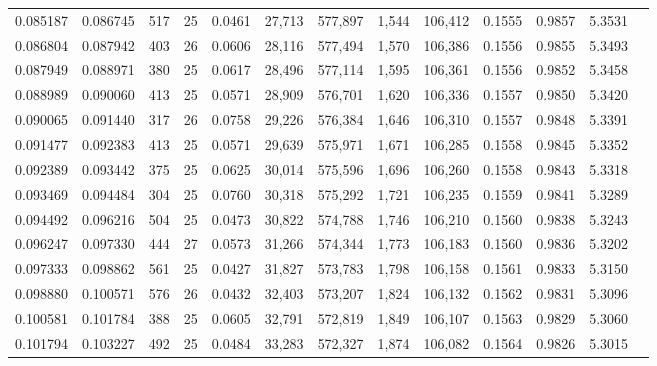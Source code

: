 \begin{tabular}{rrrrrrrrrrrrr}
0.085187 & 0.086745 &   517 &  25 &                                     0.0461 &  27,713 & 577,897 &   1,544 & 106,412 & 0.1555 & 0.9857 & 5.3531 \\
0.086804 & 0.087942 &   403 &  26 &                                     0.0606 &  28,116 & 577,494 &   1,570 & 106,386 & 0.1556 & 0.9855 & 5.3493 \\
0.087949 & 0.088971 &   380 &  25 &                                     0.0617 &  28,496 & 577,114 &   1,595 & 106,361 & 0.1556 & 0.9852 & 5.3458 \\
0.088989 & 0.090060 &   413 &  25 &                                     0.0571 &  28,909 & 576,701 &   1,620 & 106,336 & 0.1557 & 0.9850 & 5.3420 \\
0.090065 & 0.091440 &   317 &  26 &                                     0.0758 &  29,226 & 576,384 &   1,646 & 106,310 & 0.1557 & 0.9848 & 5.3391 \\
0.091477 & 0.092383 &   413 &  25 &                                     0.0571 &  29,639 & 575,971 &   1,671 & 106,285 & 0.1558 & 0.9845 & 5.3352 \\
0.092389 & 0.093442 &   375 &  25 &                                     0.0625 &  30,014 & 575,596 &   1,696 & 106,260 & 0.1558 & 0.9843 & 5.3318 \\
0.093469 & 0.094484 &   304 &  25 &                                     0.0760 &  30,318 & 575,292 &   1,721 & 106,235 & 0.1559 & 0.9841 & 5.3289 \\
0.094492 & 0.096216 &   504 &  25 &                                     0.0473 &  30,822 & 574,788 &   1,746 & 106,210 & 0.1560 & 0.9838 & 5.3243 \\
0.096247 & 0.097330 &   444 &  27 &                                     0.0573 &  31,266 & 574,344 &   1,773 & 106,183 & 0.1560 & 0.9836 & 5.3202 \\
0.097333 & 0.098862 &   561 &  25 &                                     0.0427 &  31,827 & 573,783 &   1,798 & 106,158 & 0.1561 & 0.9833 & 5.3150 \\
0.098880 & 0.100571 &   576 &  26 &                                     0.0432 &  32,403 & 573,207 &   1,824 & 106,132 & 0.1562 & 0.9831 & 5.3096 \\
0.100581 & 0.101784 &   388 &  25 &                                     0.0605 &  32,791 & 572,819 &   1,849 & 106,107 & 0.1563 & 0.9829 & 5.3060 \\
0.101794 & 0.103227 &   492 &  25 &                                     0.0484 &  33,283 & 572,327 &   1,874 & 106,082 & 0.1564 & 0.9826 & 5.3015 \\

\end{tabular}
